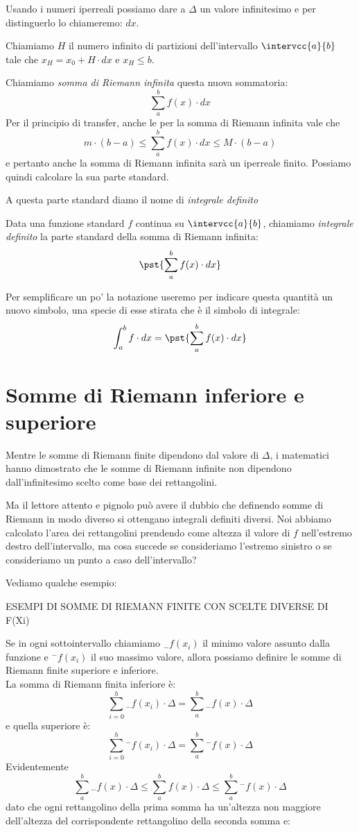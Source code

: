 Usando i numeri iperreali possiamo dare a \(\Delta\) un valore infinitesimo e 
per distinguerlo lo chiameremo: \(dx\).

Chiamiamo \(H\) il numero infinito di partizioni dell'intervallo 
\(\intervcc{a}{b}\) tale che \(x_H = x_0 + H \cdot dx\) e \(x_H \le b\).

Chiamiamo \emph{somma di Riemann infinita} questa nuova sommatoria:
\[\sum_a^b f(x) \cdot dx\]
Per il principio di transfer, anche le per la somma di Riemann infinita vale 
che 
\[m \cdot (b - a) \le  \sum_a^b f(x) \cdot dx  \le M\cdot(b - a)\]
e pertanto anche la somma di Riemann infinita sarà un iperreale finito. 
Possiamo quindi calcolare la sua parte standard. 

A questa parte standard diamo il nome di \emph{integrale definito}
\begin{definizione}
Data una funzione standard \(f\) continua su \(\intervcc{a}{b}\),
chiamiamo \emph{integrale definito} la parte standard della 
somma di Riemann infinita:
\[\pst{\sum_a^b f(x) \cdot dx}\]
\end{definizione}

Per semplificare un po' la notazione useremo per indicare questa quantità un 
nuovo simbolo, una specie di esse stirata che è il simbolo di integrale:
\[\int_a^b f \cdot dx = \pst{\sum_a^b f(x) \cdot dx}\]

\section{Somme di Riemann inferiore e superiore}
\label{sec:integrali_somme_riemann}

Mentre le somme di Riemann finite dipendono dal valore di \(\Delta\), i 
matematici hanno dimostrato che le somme di Riemann infinite non dipendono 
dall'infinitesimo scelto come base dei rettangolini.

Ma il lettore attento e pignolo può avere il dubbio che definendo somme di 
Riemann in modo diverso si ottengano integrali definiti diversi. Noi abbiamo 
calcolato l'area dei rettangolini prendendo come altezza il valore di \(f\) 
nell'estremo destro dell'intervallo, ma cosa succede se consideriamo 
l'estremo sinistro o se consideriamo un punto a caso dell'intervallo?

Vediamo qualche esempio:

ESEMPI DI SOMME DI RIEMANN FINITE CON SCELTE DIVERSE DI F(Xi) %

Se in ogni sottointervallo chiamiamo \({}_{-}f(x_i)\) il minimo valore 
assunto dalla funzione e \({}^{-}f(x_i)\) il suo massimo valore, allora 
possiamo definire le somme di Riemann finite superiore e inferiore. \\
La somma di Riemann finita inferiore è: 
\[\sum_{i=0}^h{}_{-}f(x_i)\cdot\Delta = \sum_a^b{}_{-} f(x) \cdot \Delta\] 
e quella superiore è: 
\[\sum_{i=0}^h {}^{-}f(x_i)\cdot\Delta = \sum_a^b {}^{-}f(x) \cdot \Delta\]
Evidentemente 
\[\sum_a^b{}_{-}f(x) \cdot \Delta \le \sum_a^b f(x) \cdot \Delta \le 
\sum_a^b {}^{-}f(x) \cdot \Delta\] 
dato che ogni rettangolino della prima somma ha un'altezza non maggiore 
dell'altezza del corrispondente rettangolino della seconda somma e:

